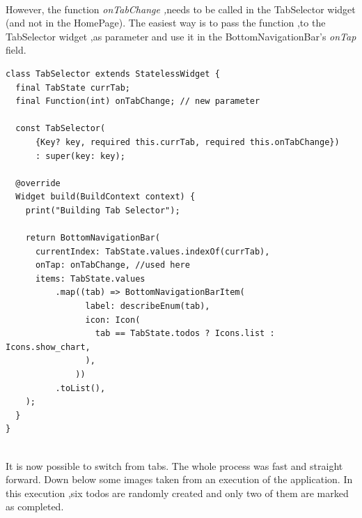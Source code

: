 \mbox{}\\
However, the function  \textit{onTabChange ,}needs to be called in the TabSelector widget (and not in the HomePage). The easiest way is to pass the function ,to the TabSelector widget ,as parameter and use it in the BottomNavigationBar's \textit{onTap }field.
\mbox{}\\
\begin{code}
\mbox{}
\label{code:2.31}
\begin{verbatim}
class TabSelector extends StatelessWidget {
  final TabState currTab;
  final Function(int) onTabChange; // new parameter

  const TabSelector(
      {Key? key, required this.currTab, required this.onTabChange})
      : super(key: key);

  @override
  Widget build(BuildContext context) {
    print("Building Tab Selector");

    return BottomNavigationBar(
      currentIndex: TabState.values.indexOf(currTab),
      onTap: onTabChange, //used here
      items: TabState.values
          .map((tab) => BottomNavigationBarItem(
                label: describeEnum(tab),
                icon: Icon(
                  tab == TabState.todos ? Icons.list : Icons.show_chart,
                ),
              ))
          .toList(),
    );
  }
}

\end{verbatim}
\end{code}
\mbox{}\\
It is now possible to switch from tabs.
The whole process was fast and straight forward. Down below some images taken from an execution of the application. In this execution ,six todos are randomly created and only two of them are marked as completed. 

